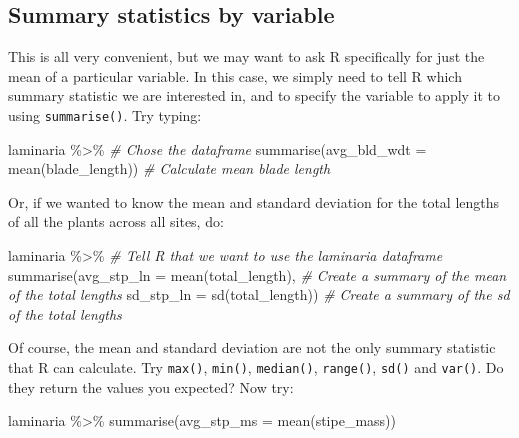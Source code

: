 \documentclass[
]{book}
\newenvironment{Shaded}{\begin{snugshade}}{\end{snugshade}}
\newcommand{\AttributeTok}[1]{\textcolor[rgb]{0.77,0.63,0.00}{#1}}
\newcommand{\CommentTok}[1]{\textcolor[rgb]{0.56,0.35,0.01}{\textit{#1}}}
\newcommand{\FunctionTok}[1]{\textcolor[rgb]{0.00,0.00,0.00}{#1}}
\newcommand{\NormalTok}[1]{#1}
\newcommand{\SpecialCharTok}[1]{\textcolor[rgb]{0.00,0.00,0.00}{#1}}
\begin{document}
\hypertarget{summary-statistics-by-variable}{%
\subsection{Summary statistics by variable}\label{summary-statistics-by-variable}}

This is all very convenient, but we may want to ask R specifically for just the mean of a particular variable. In this case, we simply need to tell R which summary statistic we are interested in, and to specify the variable to apply it to using \texttt{summarise()}. Try typing:

\begin{Shaded}
\begin{Highlighting}[]
\NormalTok{laminaria }\SpecialCharTok{\%\textgreater{}\%} \CommentTok{\# Chose the dataframe}
  \FunctionTok{summarise}\NormalTok{(}\AttributeTok{avg\_bld\_wdt =} \FunctionTok{mean}\NormalTok{(blade\_length)) }\CommentTok{\# Calculate mean blade length}
\end{Highlighting}
\end{Shaded}

Or, if we wanted to know the mean and standard deviation for the total lengths of all the plants across all sites, do:

\begin{Shaded}
\begin{Highlighting}[]
\NormalTok{laminaria }\SpecialCharTok{\%\textgreater{}\%} \CommentTok{\# Tell R that we want to use the \textquotesingle{}laminaria\textquotesingle{} dataframe}
  \FunctionTok{summarise}\NormalTok{(}\AttributeTok{avg\_stp\_ln =} \FunctionTok{mean}\NormalTok{(total\_length), }\CommentTok{\# Create a summary of the mean of the total lengths}
            \AttributeTok{sd\_stp\_ln =} \FunctionTok{sd}\NormalTok{(total\_length)) }\CommentTok{\# Create a summary of the sd of the total lengths}
\end{Highlighting}
\end{Shaded}

Of course, the mean and standard deviation are not the only summary statistic that R can calculate. Try \texttt{max()}, \texttt{min()}, \texttt{median()}, \texttt{range()}, \texttt{sd()} and \texttt{var()}. Do they return the values you expected? Now try:

\begin{Shaded}
\begin{Highlighting}[]
\NormalTok{laminaria }\SpecialCharTok{\%\textgreater{}\%} 
  \FunctionTok{summarise}\NormalTok{(}\AttributeTok{avg\_stp\_ms =} \FunctionTok{mean}\NormalTok{(stipe\_mass))}
\end{Highlighting}
\end{Shaded}
\end{document}
